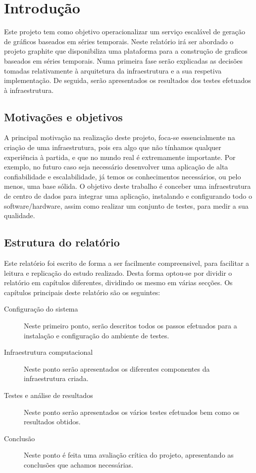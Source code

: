 \section{Introdução}

Este projeto tem como objetivo operacionalizar um serviço escalável de geração de gráficos baseados em séries temporais.
Neste relatório irá ser abordado o projeto graphite que disponibiliza uma plataforma para a construção de graficos baseados em séries temporais.
Numa primeira fase serão explicadas as decisões tomadas relativamente à arquitetura da infraestrutura e a sua respetiva implementação.
De seguida, serão apresentados os resultados dos testes efetuados à infraestrutura.

\subsection{Motivações e objetivos}

A principal motivação na realização deste projeto, foca-se essencialmente na criação de uma infraestrutura, pois era algo que não tínhamos qualquer experiência à partida, e que no mundo real é extremamente importante. Por exemplo, no futuro caso seja necessário desenvolver uma aplicação de alta confiabilidade e escalabilidade, já temos os conhecimentos necessários, ou pelo menos, uma base sólida.
O objetivo deste trabalho é conceber uma infraestrutura de centro de dados para integrar uma aplicação, instalando e configurando todo o software/hardware, assim como realizar um conjunto de testes, para medir a sua qualidade.

\subsection{Estrutura do relatório}
Este relatório foi escrito de forma a ser facilmente compreensivel, para facilitar a leitura e replicação do estudo realizado.
Desta forma optou-se por dividir o relatório em capítulos diferentes, dividindo os mesmo em várias secções. Os capítulos principais deste relatório são os seguintes:

\begin{description}

\item[Configuração do sistema]
Neste primeiro ponto, serão descritos todos os passos efetuados para a instalação e configuração do ambiente de testes.

\item[Infraestrutura computacional]
Neste ponto serão apresentados os diferentes componentes da infraestrutura criada.

\item[Testes e análise de resultados]
Neste ponto serão apresentados os vários testes efetuados bem como os resultados obtidos.

\item[Conclusão]
Neste ponto é feita uma avaliação crítica do projeto, apresentando as conclusões que achamos necessárias.

\end{description}

